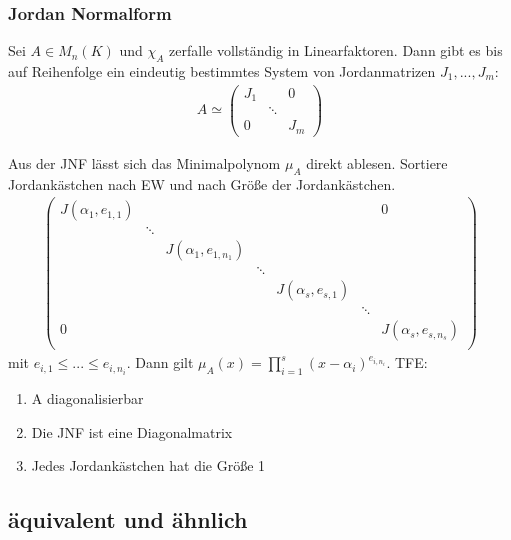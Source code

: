 \subsubsection{Jordan Normalform}
\begin{theorem}
Sei $A \in M_n(K)$ und $\chi_A$ zerfalle vollständig in Linearfaktoren. Dann gibt es bis auf Reihenfolge ein eindeutig bestimmtes System von Jordanmatrizen $J_1,...,J_m$:
\begin{align*}
A \simeq 
\begin{pmatrix}
J_1 & & 0\\
    & \ddots & \\
0   &        & J_m
\end{pmatrix}
\end{align*}
\end{theorem}
\begin{remark}
Aus der JNF lässt sich das Minimalpolynom $\mu_A$ direkt ablesen. Sortiere Jordankästchen nach EW und nach Größe der Jordankästchen.
\begin{align*}
\begin{pmatrix}
J(\alpha_1,e_{1,1}) & & & & & & 0\\
& \ddots & & & & & \\
 & & J(\alpha_1,e_{1,n_1}) & & & & \\
 & & & \ddots & & & \\
 & & & & J(\alpha_s,e_{s,1}) & &\\
 & & & & & \ddots & \\
0 & & & & & & J(\alpha_s,e_{s,n_s}) \\
\end{pmatrix}
\end{align*}
mit $e_{i,1} \leq ... \leq e_{i,n_i}$. Dann gilt $\mu_A(x)=\prod \limits_{i=1}^s (x-\alpha_i)^{e_{i,n_i}}$. TFE:
\begin{enumerate}
	\item A diagonalisierbar
	\item Die JNF ist eine Diagonalmatrix
	\item Jedes Jordankästchen hat die Größe 1
\end{enumerate}
\end{remark}

\subsection{äquivalent und ähnlich}

